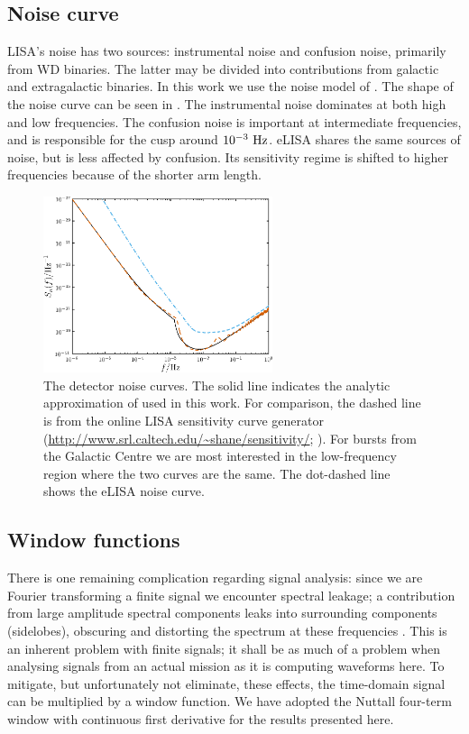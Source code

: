 \subsection{Noise curve}\label{sec:Noise}

LISA's noise has two sources: instrumental noise and confusion noise, primarily from WD binaries. The latter may be divided into contributions from galactic and extragalactic binaries. In this work we use the noise model of \citet{Barack2004}. The shape of the noise curve can be seen in . The instrumental noise dominates at both high and low frequencies. The confusion noise is important at intermediate frequencies, and is responsible for the cusp around $10^{-3}~\mathrm{Hz}$. eLISA shares the same sources of noise, but is less affected by confusion. Its sensitivity regime is shifted to higher frequencies because of the shorter arm length.
\begin{figure}[!htp]
\begin{center}
\includegraphics[width=0.6\textwidth]{./images/Fig_Noise}
\caption{The detector noise curves. The solid line indicates the analytic approximation of \citet{Barack2004} used in this work. For comparison, the dashed line is from the online LISA sensitivity curve generator (\url{http://www.srl.caltech.edu/~shane/sensitivity/}; \citealt*{Larson2000, Larson2002}). For bursts from the Galactic Centre we are most interested in the low-frequency region where the two curves are the same. The dot-dashed line shows the eLISA noise curve.\label{fig:Noise}}
\end{center}
\end{figure}

\subsection{Window functions}

There is one remaining complication regarding signal analysis: since we are Fourier transforming a finite signal we encounter spectral leakage; a contribution from large amplitude spectral components leaks into surrounding components (sidelobes), obscuring and distorting the spectrum at these frequencies \citep{Harris1978}. This is an inherent problem with finite signals; it shall be as much of a problem when analysing signals from an actual mission as it is computing waveforms here. To mitigate, but unfortunately not eliminate, these effects, the time-domain signal can be multiplied by a window function. We have adopted the Nuttall four-term window with continuous first derivative \citep{Nuttall1981} for the results presented here.

